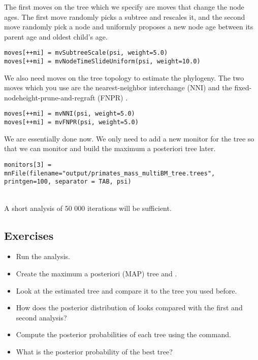 The first moves on the tree which we specify are moves that change the node ages. The first move randomly picks a subtree and rescales it, and the second move randomly pick a node and uniformly proposes a new node age between its parent age and oldest child's age.
{\tt \small \begin{snugshade*}
\begin{lstlisting}
moves[++mi] = mvSubtreeScale(psi, weight=5.0)
moves[++mi] = mvNodeTimeSlideUniform(psi, weight=10.0)
\end{lstlisting}
\end{snugshade*}}

We also need moves on the tree topology to estimate the phylogeny. The two moves which you use are the nearest-neighbor interchange (NNI) and the fixed-nodeheight-prune-and-regraft (FNPR) \citep{Hohna2012}.
{\tt \small \begin{snugshade*}
\begin{lstlisting}
moves[++mi] = mvNNI(psi, weight=5.0)
moves[++mi] = mvFNPR(psi, weight=5.0)\end{lstlisting}
\end{snugshade*}}
We are essentially done now. We  only need to add a new monitor for the tree so that we can monitor and build the maximum a posteriori tree later.
{\tt \small \begin{snugshade*}
\begin{lstlisting}
monitors[3] = mnFile(filename="output/primates_mass_multiBM_tree.trees", printgen=100, separator = TAB, psi)
\end{lstlisting}
\end{snugshade*}}

\noindent \\ \impmark A short analysis of 50 000 iterations will be sufficient.


\subsection*{Exercises}

\begin{itemize}
\item
Run the analysis.
\item
Create the maximum a posteriori (MAP) tree  and .
\item
Look at the estimated tree and compare it to the tree you used before.
\item 
How does the posterior distribution of  looks compared with the first and second analysis?
\item
Compute the posterior probabilities of each tree using the  command.
\item
What is the posterior probability of the best tree?
\end{itemize}

